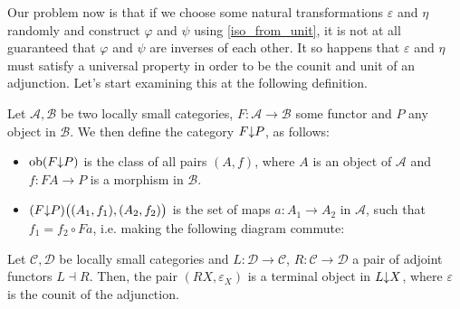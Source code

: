 Our problem now is that if we choose some natural transformations $\varepsilon$ and $\eta$ randomly and construct $\varphi$ and $\psi$ using \eqref{iso_from_unit}, it is not at all guaranteed that $\varphi$ and $\psi$ are inverses of each other. It so happens that $\varepsilon$ and $\eta$ must satisfy a universal property in order to be the counit and unit of an adjunction. Let's start examining this at the following definition.
\begin{definition}[2.3.4] Let $\mathcal{A},\mathcal{B}$ be two locally small categories, $F:\mathcal{A}\to\mathcal{B}$ some functor and $P$ any object in $\mathcal{B}$. We then define the category $F\mkern-5mu\downarrow\mkern-5mu P$, as follows:
\begin{itemize}
\item $\mathrm{ob}(F\mkern-5mu\downarrow\mkern-5mu P)$ is the class of all pairs $(A,f)$, where $A$ is an object of $\mathcal{A}$ and $f:FA\to P$ is a morphism in $\mathcal{B}$.
\item $(F\mkern-5mu\downarrow\mkern-5mu P)\big((A_1,f_1),(A_2,f_2)\big)$ is the set of maps $a:A_1\to A_2$ in $\mathcal{A}$, such that $f_1=f_2\circ Fa$, i.e. making the following diagram commute:
\begin{center}
\end{center}
\end{itemize}
\end{definition}
\begin{proposition}[co-2.3.5] Let $\mathcal{C},\mathcal{D}$ be locally small categories and $L:\mathcal{D}\to\mathcal{C}$, $R:\mathcal{C}\to\mathcal{D}$ a pair of adjoint functors $L\dashv R$. Then, the pair $(RX, \varepsilon_X)$ is a terminal object in $L\mkern-5mu\downarrow\mkern-5mu X$, where $\varepsilon$ is the counit of the adjunction.
\end{proposition}
